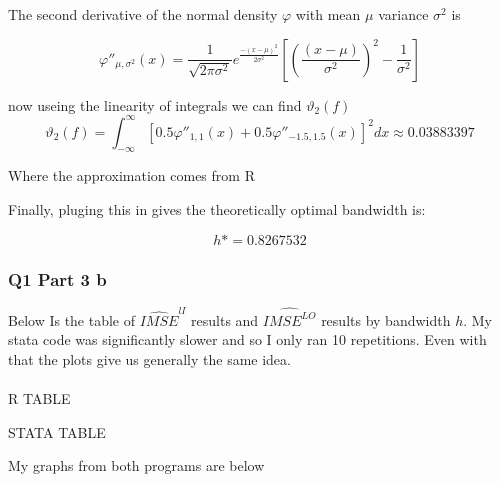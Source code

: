\documentclass[11pt]{article}
\begin{document}
The second derivative of the normal density $\varphi$ with mean $\mu$ variance $\sigma^2$ is 

$$\varphi''_{\mu, \sigma^2}(x) = \frac{1}{\sqrt{2 \pi \sigma^2 }}e^{\frac{-(x-\mu)^2}{2\sigma^2}} \left[ \left( \frac{(x - \mu)}{\sigma^2} \right)^2 - \frac{1}{\sigma^2} \right]
$$

now useing the linearity of integrals we can find $\vartheta_{2}(f)$
$$ \vartheta_{2}(f) = \int_{-\infty}^{\infty} [0.5 \varphi''_{1,1}(x) + 0.5 \varphi''_{-1.5, 1.5}(x)]^2dx \approx 0.03883397
$$

Where the approximation comes from R 

Finally, pluging this in gives the theoretically optimal bandwidth is: 

$$h* = 0.8267532
$$

\subsubsection{Q1 Part 3 b}

Below Is the table of $\widehat{IMSE}^{lI}$ results and $\widehat{IMSE^{LO}}$ results by bandwidth $h$. My stata code was significantly slower and so I only ran 10 repetitions. Even with that the plots give us generally the same idea. \\ \\ 
R TABLE
\begin{center}
	
\end{center}

STATA TABLE
\begin{center}
	
\end{center}


My graphs from both programs are below 
\end{document}
